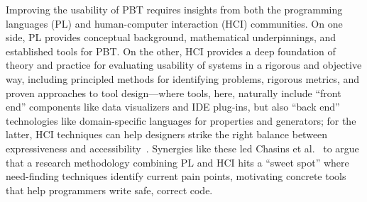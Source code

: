 
Improving the usability of PBT
requires insights from both the
programming languages (PL) and human-computer interaction (HCI)
communities.  On one side, PL provides conceptual background,
mathematical underpinnings, and established tools for PBT.  On the
other, HCI provides a deep foundation of theory and
practice for evaluating usability of systems in a
rigorous and objective way, including principled methods for
identifying problems, rigorous metrics, and proven
approaches to tool design---where tools, here, naturally include
``front end'' components like
data visualizers and IDE plug-ins, but
also ``back end'' technologies like domain-specific languages for
properties and generators; for the latter, HCI techniques
can help designers
strike the right balance between expressiveness and
accessibility~\cite{coblenz_pliers_2021,greenman_little_2022}.
Synergies like these led
Chasins et al.~\cite{chasins_pl_2021} to argue that a research
methodology combining PL and HCI hits a ``sweet spot'' where
need-finding techniques identify current
pain points, motivating concrete tools that help programmers write
safe, correct code.



